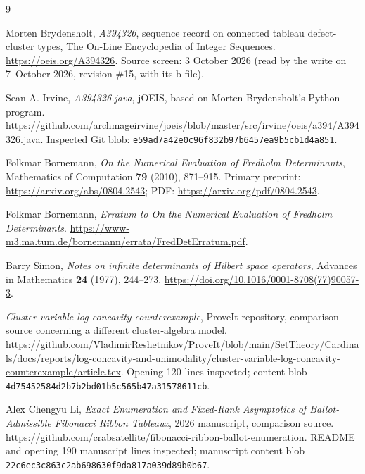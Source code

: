 \documentclass[11pt]{article}
\theoremstyle{definition}\newtheorem{definition}[theorem]{Definition}
\theoremstyle{remark}\newtheorem{remark}[theorem]{Remark}
\begin{document}
\begin{thebibliography}{9}
\raggedright
{}
Morten Brydensholt, \emph{A394326}, sequence record on connected tableau defect-cluster types, The On-Line Encyclopedia of Integer Sequences.
\url{https://oeis.org/A394326}. Source screen: 3 October 2026 (read by the write on 7~October 2026, revision \#15, with its b-file).

Sean A. Irvine, \emph{A394326.java}, jOEIS, based on Morten Brydensholt's Python program.
\url{https://github.com/archmageirvine/joeis/blob/master/src/irvine/oeis/a394/A394326.java}.
Inspected Git blob: \texttt{e59ad7a42e0c96f832b97b6457ea9b5cb1d4a851}.

Folkmar Bornemann, \emph{On the Numerical Evaluation of Fredholm Determinants}, Mathematics of Computation \textbf{79} (2010), 871--915. Primary preprint:
\url{https://arxiv.org/abs/0804.2543}; PDF:
\url{https://arxiv.org/pdf/0804.2543}.

Folkmar Bornemann, \emph{Erratum to On the Numerical Evaluation of Fredholm Determinants}.
\url{https://www-m3.ma.tum.de/bornemann/errata/FredDetErratum.pdf}.

Barry Simon, \emph{Notes on infinite determinants of Hilbert space operators}, Advances in Mathematics \textbf{24} (1977), 244--273.
\url{https://doi.org/10.1016/0001-8708(77)90057-3}.

\emph{Cluster-variable log-concavity counterexample}, ProveIt repository, comparison source concerning a different cluster-algebra model.
\url{https://github.com/VladimirReshetnikov/ProveIt/blob/main/SetTheory/Cardinals/docs/reports/log-concavity-and-unimodality/cluster-variable-log-concavity-counterexample/article.tex}.
Opening 120 lines inspected; content blob \texttt{4d75452584d2b7b2bd01b5c565b47a31578611cb}.

Alex Chengyu Li, \emph{Exact Enumeration and Fixed-Rank Asymptotics of Ballot-Admissible Fibonacci Ribbon Tableaux}, 2026 manuscript, comparison source.
\url{https://github.com/crabsatellite/fibonacci-ribbon-ballot-enumeration}.
README and opening 190 manuscript lines inspected; manuscript content blob
\texttt{22c6ec3c863c2ab698630f9da817a039d89b0b67}.
\end{thebibliography}
\end{document}
